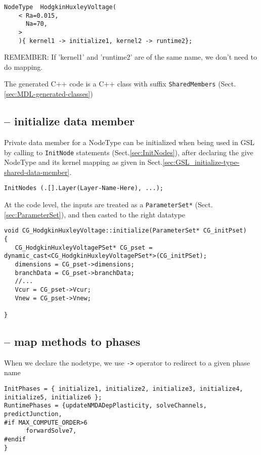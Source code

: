 \begin{itemize}
\begin{verbatim}
NodeType  HodgkinHuxleyVoltage(
    < Ra=0.015,
      Na=70,
    >
    ){ kernel1 -> initialize1, kernel2 -> runtime2};
\end{verbatim}
REMEMBER: If 'kernel1' and 'runtime2' are of the same name, we don't need to do
mapping.

The generated C++ code is a C++ class with suffix \verb!SharedMembers!
(Sect.\ref{sec:MDL-generated-classes})


\subsection{-- initialize data member}
\label{sec:GSL_initialize-type-data-member}

Private data member for a NodeType can be initialized when being used in GSL 
by calling to \verb!InitNode! statements (Sect.\ref{sec:InitNodes}), after
declaring the give NodeType and its kernel mapping as given in
Sect.\ref{sec:GSL_initialize-type-shared-data-member}.

\begin{verbatim}
InitNodes (.[].Layer(Layer-Name-Here), ...);
\end{verbatim}


At the code level, the inputs are treated as a \verb!ParameterSet*!
(Sect.\ref{sec:ParameterSet}), and then casted to the right datatype
\begin{verbatim}
void CG_HodgkinHuxleyVoltage::initialize(ParameterSet* CG_initPset)
{
   CG_HodgkinHuxleyVoltagePSet* CG_pset = dynamic_cast<CG_HodgkinHuxleyVoltagePSet*>(CG_initPSet);
   dimensions = CG_pset->dimensions;
   branchData = CG_pset->branchData;
   //...
   Vcur = CG_pset->Vcur;
   Vnew = CG_pset->Vnew;
   
}
\end{verbatim}


\subsection{-- map methods to phases}
\label{sec:GSL_assign-MDL-component-methods-to-GSL-phases}
\label{sec:GSL-RuntimePhases}

When we declare the nodetype, we use \verb!->! operator to redirect to a given
phase name
\begin{verbatim}
InitPhases = { initialize1, initialize2, initialize3, initialize4, initialize5, initialize6 };
RuntimePhases = {updateNMDADepPlasticity, solveChannels, predictJunction,
#if MAX_COMPUTE_ORDER>6
      forwardSolve7,
#endif
}


\end{verbatim}
\end{itemize}
